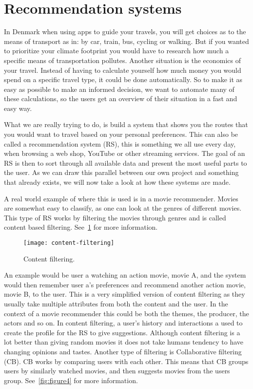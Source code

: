 \section{Recommendation systems}\label{sec:recommendation-systems}

In Denmark when using apps to guide your travels, you will get choices as to the means of transport as in: by car,
train, bus, cycling or walking.
But if you wanted to prioritize your climate footprint you would have to research how much a specific means of
transportation pollutes.
Another situation is the economics of your travel.
Instead of having to calculate yourself how much money you would spend on a specific travel type, it could be done
automatically.
So to make it as easy as possible to make an informed decision, we want to automate many of these calculations, so the
users get an overview of their situation in a fast and easy way.

What we are really trying to do, is build a system that shows you the routes that you would want to travel based on your
personal preferences.
This can also be called a recommendation system (RS), this is something we all use every day, when browsing a web shop,
YouTube or other streaming services.
The goal of an RS is then to sort through all available data and present the most useful parts to the user.
As we can draw this parallel between our own project and something that already exists, we will now take a look at how
these systems are made.

A real world example of where this is used is in a movie recommender.
Movies are somewhat easy to classify, as one can look at the genres of different movies.
This type of RS works by filtering the movies through genres and is called content based filtering.
See~\ref{fig:figure3} for more information.

\begin{figure}
    \centering
    \texttt{[image: content-filtering]}
    \caption{Content filtering.}
    \label{fig:figure3}
\end{figure}

An example would be user a watching an action movie, movie A, and the system would then remember user a's preferences
and recommend another action movie, movie B, to the user.\newline
This is a very simplified version of content filtering as they usually take multiple attributes from both the content
and the user.
In the context of a movie recommender this could be both the themes, the producer, the actors and so on.\newline
In content filtering, a user's history and interactions a used to create the profile for the RS to give suggestions.
Although content filtering is a lot better than giving random movies it does not take humans tendency to have changing
opinions and tastes.
Another type of filtering is Collaborative filtering (CB).
CB works by comparing users with each other.
This means that CB groups users by similarly watched movies, and then suggests movies from the users group.
See~\ref{fig:figure4} for more information.

